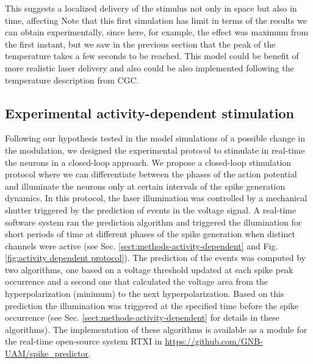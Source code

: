 This suggests a localized delivery of the stimulus not only in space but also in time, affecting  Note that this first simulation has limit in terms of the results we can obtain experimentally, since here, for example, the effect was maximum from the first instant, but we saw in the previous section that the peak of the temperature takes a few seconds to be reached. This model could be benefit of more realistic laser delivery and also could be also implemented following the temperature description from CGC. 

\subsection{Experimental activity-dependent stimulation}

Following our hypothesis tested in the model simulations of a possible change in the modulation, we designed the experimental protocol to stimulate in real-time the neurons in a closed-loop approach. We propose a closed-loop stimulation protocol where we can differentiate between the phases of the action potential and illuminate the neurons only at certain intervals of the spike generation dynamics. In this protocol, the laser illumination was controlled by a mechanical shutter triggered by the prediction of events in the voltage signal. A real-time software system ran the prediction algorithm and triggered the illumination for short periods of time at different phases of the spike generation when distinct channels were active (see Sec. \ref{sect:methods-activity-dependent} and Fig. \ref{fig:activity dependent protocol}). The prediction of the events was computed by two algorithms, one based on a voltage threshold updated at each spike peak occurrence and a second one that calculated the voltage area from the hyperpolarization (minimum) to the next hyperpolarization. Based on this prediction the illumination was triggered at the specified time before the spike occurrence (see Sec. \ref{sect:methods-activity-dependent} for details in these algorithms). The implementation of these algorithms is available as a module for the real-time open-source system RTXI \parencite{patel_hard_2017} in \href{github.com/GNB-UAM/spike_predictor}{https://github.com/GNB-UAM/spike\_predictor}.

